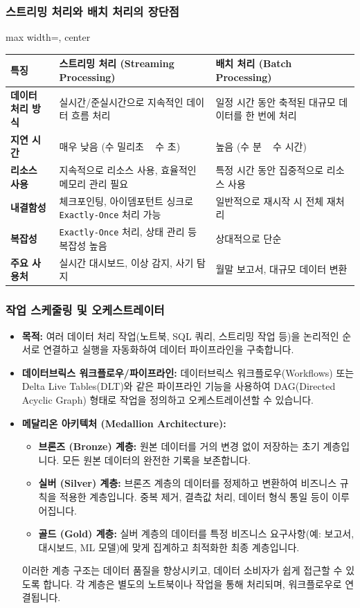 \documentclass[11pt,a4paper]{article}
\theoremstyle{definition}
\begin{document}
\subsubsection{스트리밍 처리와 배치 처리의 장단점}
\begin{adjustbox}{max width=\textwidth, center}
\begin{tabular}{lll}
\toprule
\textbf{특징} & \textbf{스트리밍 처리 (Streaming Processing)} & \textbf{배치 처리 (Batch Processing)} \\
\midrule
\textbf{데이터 처리 방식} & 실시간/준실시간으로 지속적인 데이터 흐름 처리 & 일정 시간 동안 축적된 대규모 데이터를 한 번에 처리 \\
\textbf{지연 시간} & 매우 낮음 (수 밀리초 ~ 수 초) & 높음 (수 분 ~ 수 시간) \\
\textbf{리소스 사용} & 지속적으로 리소스 사용, 효율적인 메모리 관리 필요 & 특정 시간 동안 집중적으로 리소스 사용 \\
\textbf{내결함성} & 체크포인팅, 아이뎀포턴트 싱크로 \texttt{Exactly-Once} 처리 가능 & 일반적으로 재시작 시 전체 재처리 \\
\textbf{복잡성} & \texttt{Exactly-Once} 처리, 상태 관리 등 복잡성 높음 & 상대적으로 단순 \\
\textbf{주요 사용처} & 실시간 대시보드, 이상 감지, 사기 탐지 & 월말 보고서, 대규모 데이터 변환 \\
\bottomrule
\end{tabular}
\end{adjustbox}

\subsubsection{작업 스케줄링 및 오케스트레이터}
\begin{itemize}
    \item \textbf{목적:} 여러 데이터 처리 작업(노트북, SQL 쿼리, 스트리밍 작업 등)을 논리적인 순서로 연결하고 실행을 자동화하여 데이터 파이프라인을 구축합니다.
    \item \textbf{데이터브릭스 워크플로우/파이프라인:} 데이터브릭스 워크플로우(Workflows) 또는 Delta Live Tables(DLT)와 같은 파이프라인 기능을 사용하여 DAG(Directed Acyclic Graph) 형태로 작업을 정의하고 오케스트레이션할 수 있습니다.
    \item \textbf{메달리온 아키텍처 (Medallion Architecture):}
    \begin{itemize}
        \item \textbf{브론즈 (Bronze) 계층:} 원본 데이터를 거의 변경 없이 저장하는 초기 계층입니다. 모든 원본 데이터의 완전한 기록을 보존합니다.
        \item \textbf{실버 (Silver) 계층:} 브론즈 계층의 데이터를 정제하고 변환하여 비즈니스 규칙을 적용한 계층입니다. 중복 제거, 결측값 처리, 데이터 형식 통일 등이 이루어집니다.
        \item \textbf{골드 (Gold) 계층:} 실버 계층의 데이터를 특정 비즈니스 요구사항(예: 보고서, 대시보드, ML 모델)에 맞게 집계하고 최적화한 최종 계층입니다.
    \end{itemize}
    이러한 계층 구조는 데이터 품질을 향상시키고, 데이터 소비자가 쉽게 접근할 수 있도록 합니다. 각 계층은 별도의 노트북이나 작업을 통해 처리되며, 워크플로우로 연결됩니다.
\end{itemize}
\end{document}
